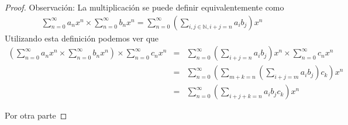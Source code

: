 \documentclass[letter,twoside,12pt]{article}
\begin{document}
\begin{enumerate}[label=\textbf{(\alph*)}]
\begin{proof}
Observaci\'on: La multiplicaci\'on se puede definir equivalentemente como
\begin{eqnarray}
\sum_{n=0}^\infty a_nx^n \times \sum_{n=0}^\infty b_nx^n = \sum_{n=0}^\infty (\sum_{i,j \in \mathbb{N},i+j=n} a_ib_j)x^n \nonumber
\end{eqnarray}
Utilizando esta definici\'on podemos ver que
\begin{eqnarray}
(\sum_{n=0}^{\infty}a_nx^n \times \sum_{n=0}^{\infty}b_nx^n) \times  \sum_{n=0}^{\infty}c_nx^n&=& \sum_{n=0}^{\infty}(\sum_{i+j=n}a_ib_j)x^n \times  \sum_{n=0}^{\infty}c_nx^n\nonumber
\\&=&\sum_{n=0}^{\infty}(\sum_{m+k=n}(\sum_{i+j=m}a_ib_{j})c_{k})x^n
\nonumber
\\&=&\sum_{n=0}^{\infty}(\sum_{i+j+k=n}a_ib_{j}c_{k})x^n
\nonumber
\end{eqnarray}

Por otra parte


\end{proof}
\end{enumerate}
\end{document}

